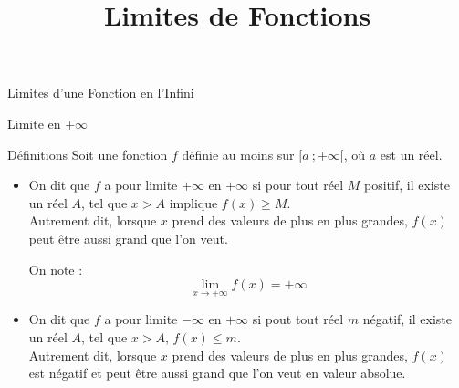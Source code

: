 \documentclass{cours}
\title{Limites de Fonctions}
\begin{document}

    \begin{Gpartie}{Limites d'une Fonction en l'Infini} 
        \begin{Spartie}{Limite en $+\infty$} 
            \begin{SSpartie}{Définitions} 
                Soit une fonction $f$ définie au moins sur $\big[a~;+\infty\big[$, où $a$ est un réel.

                \begin{itemize}
                    \item   On dit que $f$ a pour limite $+\infty$ en $+\infty$ si pour tout réel $M$ positif, il existe un réel $A$, tel que $x>A$ implique $f(x)\geq M$. \\ Autrement dit, lorsque $x$ prend des valeurs de plus en plus grandes, $f(x)$ peut être aussi grand que l'on veut.
                    
                    On note : \[\boxed{\lim\limits_{x\to +\infty}f(x)=+\infty}\] 
                    \begin{center}
                        \parbox{\linewidth}{}
                    \end{center}
                    \vspace*{2ex}
                    \item   On dit que $f$ a pour limite $-\infty$ en $+\infty$ si pout tout réel $m$ négatif, il existe un réel $A$, tel que $x>A$, $f(x)\leq m$. \\ Autrement dit, lorsque $x$ prend des valeurs de plus en plus grandes, $f(x)$ est négatif et peut être aussi grand que l'on veut en valeur absolue.
                    

\end{itemize}
\end{SSpartie}
\end{Spartie}
\end{Gpartie}
\end{document}
